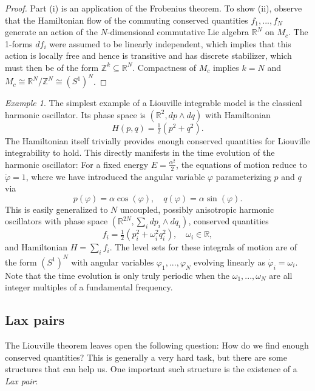 \documentclass[11pt]{report}
\theoremstyle{definition}
\theoremstyle{remark}
\theoremstyle{remark}
\newtheorem*{example}{Example}
\newcommand{\Z}{\mathbb{Z}}
\newcommand{\R}{\mathbb{R}}
\begin{document}
\begin{proof}
Part (i) is an application of the Frobenius theorem. To show (ii), observe that the Hamiltonian flow of the commuting conserved quantities $f_1,...,f_N$ generate an action of the $N$-dimensional commutative Lie algebra $\R^N$ on $M_c$. The 1-forms $df_i$ were assumed to be linearly independent, which implies that this action is locally free and hence is transitive and has discrete stabilizer, which must then be of the form $\Z^k \subseteq \R^N$. Compactness of $M_c$ implies $k=N$ and $M_c \cong \R^N / \Z^N \cong (S^1)^N$.
\end{proof}

\begin{example}
The simplest example of a Liouville integrable model is the classical harmonic oscillator. Its phase space is $(\R^2,dp \wedge dq)$ with Hamiltonian
\begin{equation*}
H(p,q) = \tfrac{1}{2} (p^2 + q^2).
\end{equation*}
The Hamiltonian itself trivially provides enough conserved quantities for Liouville integrability to hold. This directly manifests in the time evolution of the harmonic oscillator: For a fixed energy $E = \frac{\alpha^2}{2}$, the equations of motion reduce to $\dot \varphi = 1$, where we have introduced the angular variable $\varphi$ parameterizing $p$ and $q$ via
\begin{equation*}
p(\varphi) = \alpha \cos(\varphi), \quad q(\varphi) = \alpha \sin(\varphi).
\end{equation*}
This is easily generalized to $N$ uncoupled, possibly anisotropic harmonic oscillators with phase space $(\R^{2N},\sum_i dp_i \wedge dq_i)$, conserved quantities
\begin{equation*}
f_i = \tfrac{1}{2}(p_i^2 + \omega_i^2 q_i^2), \quad \omega_i \in \R,
\end{equation*}
and Hamiltonian $H = \sum_i f_i$. The level sets for these integrals of motion are of the form $(S^1)^N$ with angular variables $\varphi_1,...,\varphi_N$ evolving linearly as $\dot \varphi_i = \omega_i$. Note that the time evolution is only truly periodic when the $\omega_1,...,\omega_N$ are all integer multiples of a fundamental frequency.
\end{example}

\subsection{Lax pairs}

The Liouville theorem leaves open the following question: How do we find enough conserved quantities? This is generally a very hard task, but there are some structures that can help us. One important such structure is the existence of a \emph{Lax pair}:
\end{document}
